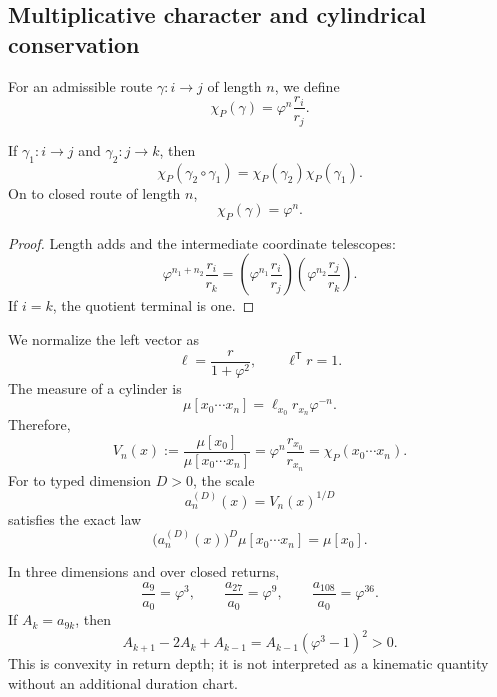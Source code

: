 \subsection{Multiplicative character and cylindrical conservation}

For an admissible route \(\gamma:i\to j\) of length \(n\), we define
\begin{equation}
 \chi_P(\gamma)=\varphi^n\frac{r_i}{r_j}.
 \label{p12-83-c9-s3:eq:caracter-parry-phi}
\end{equation}

\begin{proposition}
\label{p12-83-c9-s3:prop:multiplicatividad-parry-phi}
If \(\gamma_1:i\to j\) and \(\gamma_2:j\to k\), then
\[
 \chi_P(\gamma_2\circ\gamma_1)
 =\chi_P(\gamma_2)\chi_P(\gamma_1).
\]
On to closed route of length \(n\),
\[
 \chi_P(\gamma)=\varphi^n.
\]
\end{proposition}

\begin{proof}
Length adds and the intermediate coordinate telescopes:
\[
 \varphi^{n_1+n_2}\frac{r_i}{r_k}
 =\left(\varphi^{n_1}\frac{r_i}{r_j}\right)
  \left(\varphi^{n_2}\frac{r_j}{r_k}\right).
\]
If \(i=k\), the quotient terminal is one.
\end{proof}

We normalize the left vector as
\[
 \ell=\frac{r}{1+\varphi^2},
 \qquad
 \ell^{\mathsf T}r=1.
\]
The measure of a cylinder is
\[
 \mu[x_0\cdots x_n]
 =\ell_{x_0}r_{x_n}\varphi^{-n}.
\]
Therefore,
\begin{equation}
 V_n(x)
 :=\frac{\mu[x_0]}{\mu[x_0\cdots x_n]}
 =\varphi^n\frac{r_{x_0}}{r_{x_n}}
 =\chi_P(x_0\cdots x_n).
 \label{p12-83-c9-s3:eq:volumen-cilindrico-phi}
\end{equation}
For to typed dimension \(D>0\), the scale
\[
 a_n^{(D)}(x)=V_n(x)^{1/D}
\]
satisfies the exact law
\begin{equation}
 \boxed{
 \bigl(a_n^{(D)}(x)\bigr)^D
 \mu[x_0\cdots x_n]=\mu[x_0].}
 \label{p12-83-c9-s3:eq:conservacion-cilindrica-phi}
\end{equation}

In three dimensions and over closed returns,
\[
 \frac{a_9}{a_0}=\varphi^3,
 \qquad
 \frac{a_{27}}{a_0}=\varphi^9,
 \qquad
 \frac{a_{108}}{a_0}=\varphi^{36}.
\]
If \(A_k=a_{9k}\), then
\begin{equation}
 A_{k+1}-2A_k+A_{k-1}
 =A_{k-1}(\varphi^3-1)^2>0.
 \label{p12-83-c9-s3:eq:convexidad-retornos-phi}
\end{equation}
This is convexity in return depth; it is not interpreted as a
kinematic quantity without an additional duration chart.


